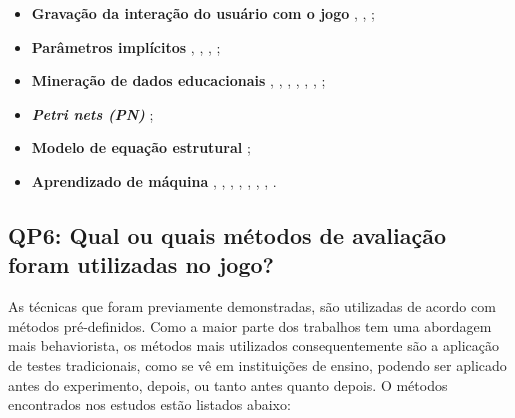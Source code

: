 \documentclass[12pt]{article}
\begin{document}
\begin{itemize}
    \item \textbf{Gravação da interação do usuário com o jogo} \cite{rowe2017assessing}, \cite{asbell2013assessment}, \cite{conrad2014framework};
    \item \textbf{Parâmetros implícitos} \cite{rowe2017assessing}, \cite{del2010easing}, \cite{de20163d}, \cite{falakmasir2016data};
    \item \textbf{Mineração de dados educacionais} \cite{rowe2017assessing}, \cite{asbell2013assessment}, \cite{georgiadis2018accommodating}, \cite{georgiadis2019learning}, \cite{georgiadis2019bolstering}, \cite{georgiadis2019reinforcing}, \cite{min2019deepstealth};
    \item \textbf{\textit{Petri nets (PN)}} \cite{thomas2012evaluate};
    \item \textbf{Modelo de equação estrutural} \cite{baron2014approach};
    \item \textbf{Aprendizado de máquina} \cite{harpstead2013search}, \cite{conrad2014framework}, \cite{falakmasir2016data}, \cite{georgiadis2018accommodating}, \cite{georgiadis2019learning}, \cite{georgiadis2019bolstering}, \cite{georgiadis2019reinforcing}, \cite{min2019deepstealth}.
\end{itemize}

\subsection{QP6: Qual ou quais métodos de avaliação foram utilizadas no jogo?}

As técnicas que foram previamente demonstradas, são utilizadas de acordo com métodos pré-definidos. Como a maior parte dos trabalhos tem uma abordagem mais behaviorista, os métodos mais utilizados consequentemente são a aplicação de testes tradicionais, como se vê em instituições de ensino, podendo ser aplicado antes do experimento, depois, ou tanto antes quanto depois. O métodos encontrados nos estudos estão listados abaixo:
\end{document}

